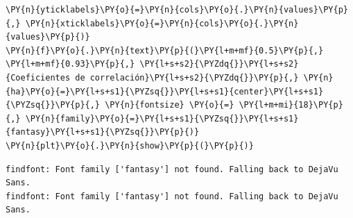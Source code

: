 \begin{tcolorbox}[breakable, size=fbox, boxrule=1pt, pad at break*=1mm,colback=cellbackground, colframe=cellborder]
\begin{Verbatim}[commandchars=\\\{\}]
                 \PY{n}{yticklabels}\PY{o}{=}\PY{n}{cols}\PY{o}{.}\PY{n}{values}\PY{p}{,} \PY{n}{xticklabels}\PY{o}{=}\PY{n}{cols}\PY{o}{.}\PY{n}{values}\PY{p}{)}
\PY{n}{f}\PY{o}{.}\PY{n}{text}\PY{p}{(}\PY{l+m+mf}{0.5}\PY{p}{,} \PY{l+m+mf}{0.93}\PY{p}{,} \PY{l+s+s2}{\PYZdq{}}\PY{l+s+s2}{Coeficientes de correlación}\PY{l+s+s2}{\PYZdq{}}\PY{p}{,} \PY{n}{ha}\PY{o}{=}\PY{l+s+s1}{\PYZsq{}}\PY{l+s+s1}{center}\PY{l+s+s1}{\PYZsq{}}\PY{p}{,} \PY{n}{fontsize} \PY{o}{=} \PY{l+m+mi}{18}\PY{p}{,} \PY{n}{family}\PY{o}{=}\PY{l+s+s1}{\PYZsq{}}\PY{l+s+s1}{fantasy}\PY{l+s+s1}{\PYZsq{}}\PY{p}{)}
\PY{n}{plt}\PY{o}{.}\PY{n}{show}\PY{p}{(}\PY{p}{)}
\end{Verbatim}
\end{tcolorbox}

    \begin{Verbatim}[commandchars=\\\{\}]
findfont: Font family ['fantasy'] not found. Falling back to DejaVu Sans.
findfont: Font family ['fantasy'] not found. Falling back to DejaVu Sans.
\end{Verbatim}

    \begin{center}
    \end{center}
    { \hspace*{\fill} \\}
    
